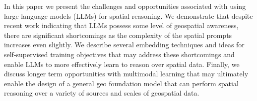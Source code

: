 
In this paper we present the challenges and opportunities associated with using large language models (LLMs) for spatial reasoning.
We demonstrate that despite recent work indicating that LLMs possess some level of geospatial awareness, there are significant shortcomings as the complexity of the spatial prompts increases even slightly.
We describe several embedding techniques and ideas for self-supervised training objectives that may address these shortcomings and enable LLMs to more effectively learn to reason over spatial data.
Finally, we discuss longer term opportunities with multimodal learning that may ultimately enable the design of a general geo foundation model that can perform spatial reasoning over a variety of sources and scales of geospatial data.


